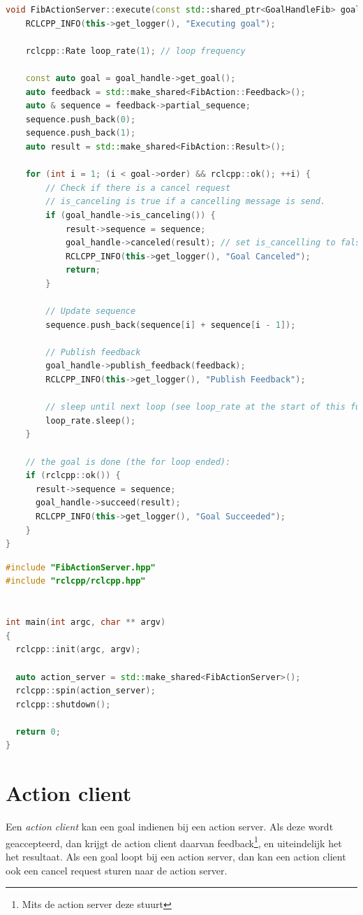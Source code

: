 \begin{lstlisting}[language=C++, caption={ActionServerNode.cpp}, firstnumber=0, label={code:action_server_cpp}]
void FibActionServer::execute(const std::shared_ptr<GoalHandleFib> goal_handle){
    RCLCPP_INFO(this->get_logger(), "Executing goal");

    rclcpp::Rate loop_rate(1); // loop frequency

    const auto goal = goal_handle->get_goal();
    auto feedback = std::make_shared<FibAction::Feedback>();
    auto & sequence = feedback->partial_sequence;
    sequence.push_back(0);
    sequence.push_back(1);
    auto result = std::make_shared<FibAction::Result>();

    for (int i = 1; (i < goal->order) && rclcpp::ok(); ++i) {
        // Check if there is a cancel request
        // is_canceling is true if a cancelling message is send.
        if (goal_handle->is_canceling()) { 
            result->sequence = sequence;
            goal_handle->canceled(result); // set is_cancelling to false again
            RCLCPP_INFO(this->get_logger(), "Goal Canceled");
            return;
        }

        // Update sequence
        sequence.push_back(sequence[i] + sequence[i - 1]);

        // Publish feedback
        goal_handle->publish_feedback(feedback);
        RCLCPP_INFO(this->get_logger(), "Publish Feedback");

        // sleep until next loop (see loop_rate at the start of this function)
        loop_rate.sleep();
    }

    // the goal is done (the for loop ended):
    if (rclcpp::ok()) {
      result->sequence = sequence;
      goal_handle->succeed(result);
      RCLCPP_INFO(this->get_logger(), "Goal Succeeded");
    }
}

\end{lstlisting}

\begin{lstlisting}[language=C++, caption={mainActionServerNode.cpp}, firstnumber=0, label={code:action_server_main}]
#include "FibActionServer.hpp"
#include "rclcpp/rclcpp.hpp"  


int main(int argc, char ** argv)
{
  rclcpp::init(argc, argv);
  
  auto action_server = std::make_shared<FibActionServer>();
  rclcpp::spin(action_server);
  rclcpp::shutdown();
  
  return 0;
}
\end{lstlisting}

\section{Action client}
Een \textit{action client} kan een goal indienen bij een action server. Als deze wordt geaccepteerd, dan krijgt de action client daarvan feedback\footnote{Mits de action server deze stuurt}, en uiteindelijk het het resultaat. Als een goal loopt bij een action server, dan kan een action client ook een cancel request sturen naar de action server.

